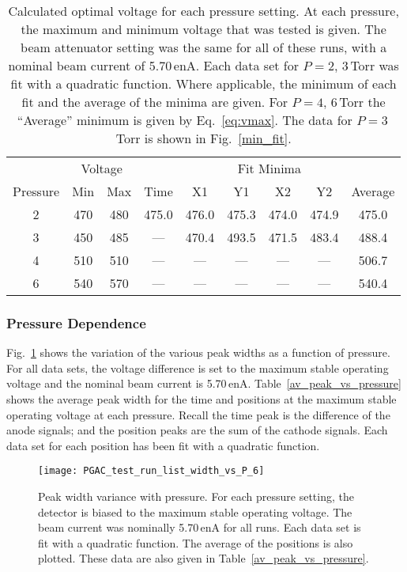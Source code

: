 \begin{table}[ht!]
\centering
\begin{tabular}{cccccccc|c}
\hline
& \multicolumn{2}{c}{Voltage} & \multicolumn{6}{c}{Fit Minima}\\ \cline{4-9}
Pressure & Min & Max & Time & X1 & Y1 & X2 & Y2 & Average\\ \hline \hline
2 & 470 & 480 & 475.0 & 476.0 & 475.3 & 474.0 & 474.9 & 475.0\\
3  & 450 & 485 & --- & 470.4 & 493.5 & 471.5 & 483.4 & 488.4\\
4  & 510 & 510 & --- & --- & --- & --- & --- & 506.7\\
6  & 540 & 570 & --- & --- & --- & --- & --- & 540.4\\
\hline
\end{tabular}
\caption{Calculated optimal voltage for each pressure setting. At each pressure, the maximum and minimum voltage that was tested is given. The beam attenuator setting was the same for all of these runs, with a nominal beam current of 5.70\,enA. Each data set for $P=2$, 3\,Torr was fit with a quadratic function. Where applicable, the minimum of each fit and the average of the minima are given. For $P=4$, 6\,Torr the ``Average'' minimum is given by Eq.~\ref{eq:vmax}. The data for $P=3$\,Torr is shown in Fig.~\ref{min_fit}. }
\label{pos_res_fit}
\end{table}

\subsubsection{Pressure Dependence}
Fig.~\ref{pressure_width} shows the variation of the various peak widths as a function of pressure. For all data sets, the voltage difference is set to the maximum stable operating voltage and the nominal beam current is 5.70\,enA.
 Table~\ref{av_peak_vs_pressure} shows the average peak width for the time and positions at the maximum stable operating voltage at each pressure. Recall the time peak is the difference of the anode signals; and the position peaks are the sum of the cathode signals. Each data set for each position has been fit with a quadratic function.


\begin{figure}
\texttt{[image: PGAC\_test\_run\_list\_width\_vs\_P\_6]}%
\caption{Peak width variance with pressure. For each pressure setting, the detector is biased to the maximum stable operating voltage. The beam current was nominally 5.70\,enA for all runs. Each data set is fit with a quadratic function. The average of the positions is also plotted. These data are also given in Table~\ref{av_peak_vs_pressure}.}%
\label{pressure_width}%
\end{figure}


